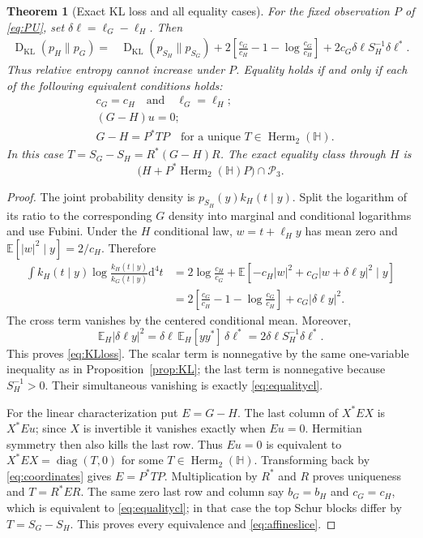 \documentclass[11pt,a4paper]{article}
\numberwithin{equation}{section}
\newtheorem{theorem}{Theorem}[section]
\theoremstyle{definition}
\theoremstyle{remark}
\newcommand{\HH}{\mathbb H}
\newcommand{\PP}{\mathcal P}
\newcommand{\Herm}{\operatorname{Herm}}
\newcommand{\diag}{\operatorname{diag}}
\newcommand{\KL}{\operatorname{D}_{\mathrm{KL}}}
\newcommand{\EE}{\mathbb E}
\begin{document}
\begin{theorem}[Exact KL loss and all equality cases]\label{thm:KLloss}
For the fixed observation $P$ of \eqref{eq:PU}, set
$\delta\ell=\ell_G-\ell_H$. Then
\begin{align}
\KL(p_H\|p_G)
={}&\KL(p_{S_H}\|p_{S_G})
 +2\left[\frac{c_G}{c_H}-1-\log\frac{c_G}{c_H}\right]
 +2c_G\delta\ell S_H^{-1}\delta\ell^*.
\label{eq:KLloss}
\end{align}
Thus relative entropy cannot increase under $P$. Equality holds if and
only if each of the following equivalent conditions holds:
\begin{align}
&c_G=c_H\quad\text{and}\quad\ell_G=\ell_H;\label{eq:equalitycl}\\
&(G-H)u=0;\label{eq:equalityu}\\
&G-H=P^*TP\quad\text{for a unique }T\in\Herm_2(\HH).
\label{eq:equalityT}
\end{align}
In this case $T=S_G-S_H=R^*(G-H)R$. The exact equality class through
$H$ is
\begin{equation}\label{eq:affineslice}
\bigl(H+P^*\Herm_2(\HH)P\bigr)\cap\PP_3.
\end{equation}
\end{theorem}
\begin{proof}
The joint probability density is $p_{S_H}(y)k_H(t\mid y)$.
Split the logarithm of its ratio to the corresponding $G$ density
into marginal and conditional logarithms and use Fubini. Under the
$H$ conditional law, $w=t+\ell_Hy$ has mean zero and
$\EE[|w|^2\mid y]=2/c_H$. Therefore
\begin{align*}
\int k_H(t\mid y)\log\frac{k_H(t\mid y)}{k_G(t\mid y)}\mathrm d^4t
&=2\log\frac{c_H}{c_G}
 +\EE[-c_H|w|^2+c_G|w+\delta\ell y|^2\mid y]\\
&=2\left[\frac{c_G}{c_H}-1-\log\frac{c_G}{c_H}\right]
 +c_G|\delta\ell y|^2.
\end{align*}
The cross term vanishes by the centered conditional mean. Moreover,
\[
\EE_H|\delta\ell y|^2
=\delta\ell\,\EE_H[yy^*]\,\delta\ell^*
=2\delta\ell S_H^{-1}\delta\ell^*.
\]
This proves \eqref{eq:KLloss}. The scalar term is nonnegative by the
same one-variable inequality as in Proposition~\ref{prop:KL}; the
last term is nonnegative because $S_H^{-1}>0$. Their simultaneous
vanishing is exactly \eqref{eq:equalitycl}.

For the linear characterization put $E=G-H$. The last column of
$X^*EX$ is $X^*Eu$; since $X$ is invertible it vanishes exactly when
$Eu=0$. Hermitian symmetry then also kills the last row. Thus
$Eu=0$ is equivalent to
$X^*EX=\diag(T,0)$ for some $T\in\Herm_2(\HH)$.
Transforming back by \eqref{eq:coordinates} gives $E=P^*TP$.
Multiplication by $R^*$ and $R$ proves uniqueness and
$T=R^*ER$. The same zero last row and column say $b_G=b_H$ and
$c_G=c_H$, which is equivalent to \eqref{eq:equalitycl}; in that case
the top Schur blocks differ by $T=S_G-S_H$. This proves every
equivalence and \eqref{eq:affineslice}.
\end{proof}
\end{document}
